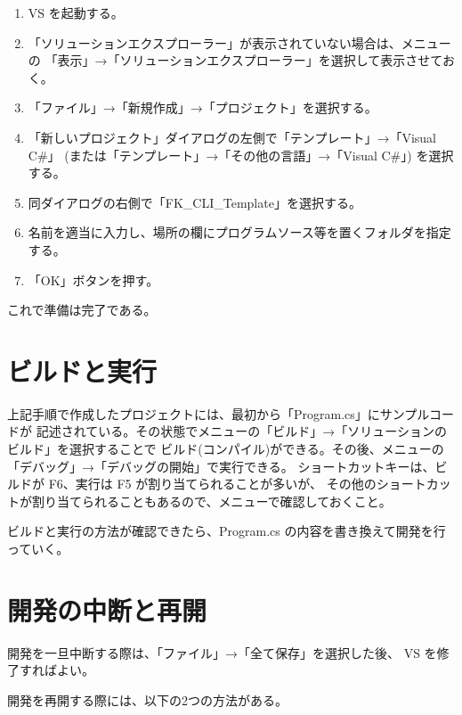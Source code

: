 \documentclass[a4paper]{jsarticle}
\begin{document}
\begin{enumerate}

 \item VS を起動する。

 \item 「ソリューションエクスプローラー」が表示されていない場合は、メニューの
	「表示」→「ソリューションエクスプローラー」を選択して表示させておく。

 \item 「ファイル」→「新規作成」→「プロジェクト」を選択する。

 \item 「新しいプロジェクト」ダイアログの左側で「テンプレート」→「Visual C\#」
	(または「テンプレート」→「その他の言語」→「Visual C\#」) を選択する。

 \item 同ダイアログの右側で「FK\_CLI\_Template」を選択する。

 \item 名前を適当に入力し、場所の欄にプログラムソース等を置くフォルダを指定する。

 \item 「OK」ボタンを押す。

\end{enumerate}

これで準備は完了である。

\section{ビルドと実行}

上記手順で作成したプロジェクトには、最初から「Program.cs」にサンプルコードが
記述されている。その状態でメニューの「ビルド」→「ソリューションのビルド」を選択することで
ビルド(コンパイル)ができる。その後、メニューの「デバッグ」→「デバッグの開始」で実行できる。
ショートカットキーは、ビルドが F6、実行は F5 が割り当てられることが多いが、
その他のショートカットが割り当てられることもあるので、メニューで確認しておくこと。

ビルドと実行の方法が確認できたら、Program.cs の内容を書き換えて開発を行っていく。

\section{開発の中断と再開}

開発を一旦中断する際は、「ファイル」→「全て保存」を選択した後、
VS を修了すればよい。

開発を再開する際には、以下の2つの方法がある。
\end{document}
